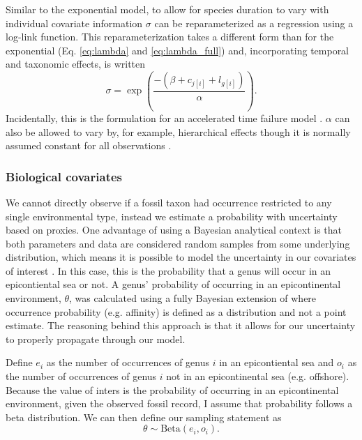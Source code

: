 \documentclass[12pt,letterpaper]{article}
\begin{document}
Similar to the exponential model, to allow for species duration to vary with individual covariate information \(\sigma\) can be reparameterized as a regression \citep{Klein2003} using a log-link function. This reparameterization takes a different form than for the exponential (Eq. \ref{eq:lambda} and \ref{eq:lambda_full}) and, incorporating temporal and taxonomic effects, is written
\begin{equation}
  \sigma = \exp\left(\frac{-(\beta + c_{j[i]} + l_{g[i]})}{\alpha}\right).
  \label{eq:sigma_full}
\end{equation}
Incidentally, this is the formulation for an accelerated time failure model \citep{Klein2003}. \(\alpha\) can also be allowed to vary by, for example, hierarchical effects though it is normally assumed constant for all observations \citep{Klein2003}.


\subsubsection{Biological covariates}

We cannot directly observe if a fossil taxon had occurrence restricted to any single environmental type, instead we estimate a probability with uncertainty based on proxies. One advantage of using a Bayesian analytical context is that both parameters and data are considered random samples from some underlying distribution, which means it is possible to model the uncertainty in our covariates of interest \citep{Gelman2013d}. In this case, this is the probability that a genus will occur in an epicontiental sea or not. 
A genus' probability of occurring in an epicontinental environment, \(\theta\), was calculated using a fully Bayesian extension of \citep{Simpson2009} where occurrence probability (e.g. affinity) is defined as a distribution and not a point estimate. The reasoning behind this approach is that it allows for our uncertainty to properly propagate through our model.

Define \(e_{i}\) as the number of occurrences of genus \(i\) in an epicontiental sea and \(o_{i}\) as the number of occurrences of genus \(i\) not in an epicontinental sea (e.g. offshore). Because the value of inters is the probability of occurring in an epicontinental environment, given the observed fossil record, I assume that probability follows a beta distribution. We can then define our sampling statement as
\begin{equation}
  \theta \sim \mathrm{Beta}(e_{i}, o_{i}).
  \label{eq:epi_lik}
\end{equation}
\end{document}
